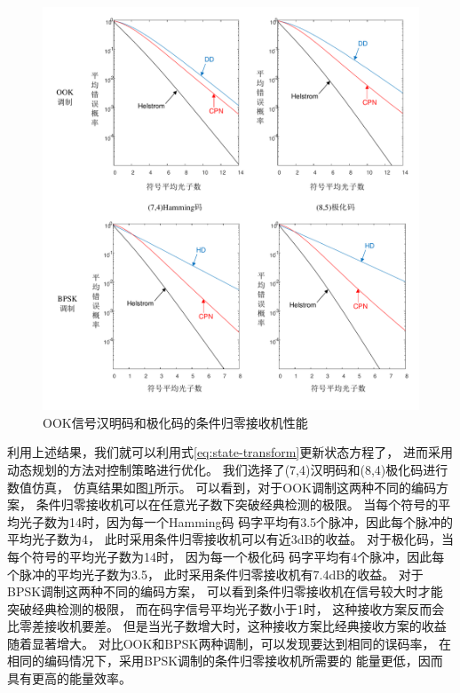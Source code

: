 \begin{figure}[H]
\centering
  \includegraphics[width=\textwidth]{figures/chap4/OOK-Code-error}
  \caption{OOK信号汉明码和极化码的条件归零接收机性能}
  \label{fig:OOK-Code-error}
\end{figure}


利用上述结果，我们就可以利用式\ref{eq:state-transform}更新状态方程了，
进而采用动态规划的方法对控制策略进行优化。
我们选择了(7,4)汉明码和(8,4)极化码进行数值仿真，
仿真结果如图\ref{fig:OOK-Code-error}所示。
可以看到，对于OOK调制这两种不同的编码方案，
条件归零接收机可以在任意光子数下突破经典检测的极限。
当每个符号的平均光子数为14时，因为每一个Hamming码
码字平均有3.5个脉冲，因此每个脉冲的平均光子数为4，
此时采用条件归零接收机可以有近3dB的收益。
对于极化码，当每个符号的平均光子数为14时，
因为每一个极化码
码字平均有4个脉冲，因此每个脉冲的平均光子数为3.5，
此时采用条件归零接收机有7.4dB的收益。
对于BPSK调制这两种不同的编码方案，
可以看到条件归零接收机在信号较大时才能突破经典检测的极限，
而在码字信号平均光子数小于1时，
这种接收方案反而会比零差接收机要差。
但是当光子数增大时，这种接收方案比经典接收方案的收益
随着显著增大。
对比OOK和BPSK两种调制，可以发现要达到相同的误码率，
在相同的编码情况下，采用BPSK调制的条件归零接收机所需要的
能量更低，因而具有更高的能量效率。


